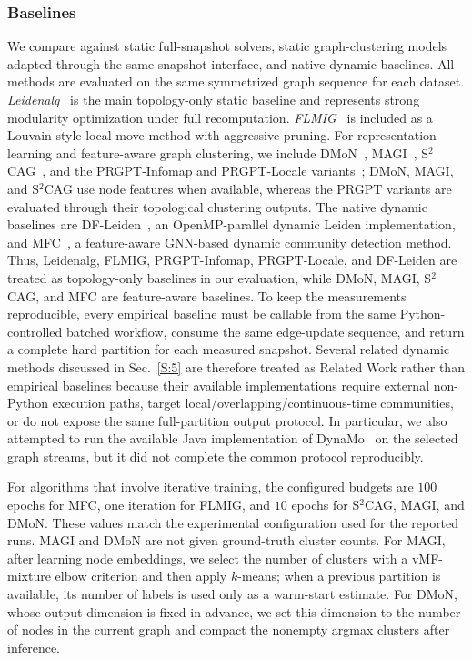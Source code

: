 \documentclass[conference]{IEEEtran}
\theoremstyle{definition}
\begin{document}
\subsubsection{Baselines}
We compare against static full-snapshot solvers, static graph-clustering
models adapted through the same snapshot interface, and native dynamic
baselines. All methods are evaluated on the same symmetrized graph sequence for
each dataset. \textit{Leidenalg}~\cite{TWE19} is the main topology-only static
baseline and represents strong modularity optimization under full
recomputation. \textit{FLMIG}~\cite{TTB24} is included as a Louvain-style local
move method with aggressive pruning. For representation-learning and
feature-aware graph clustering, we include DMoN~\cite{TPP23},
MAGI~\cite{LLC24}, S$^2$CAG~\cite{LYZ25}, and the PRGPT-Infomap and
PRGPT-Locale variants~\cite{QZG24HPEC}; DMoN, MAGI, and S$^2$CAG use node
features when available, whereas the PRGPT variants are evaluated through their
topological clustering outputs. The native dynamic baselines are
DF-Leiden~\cite{SLe24}, an OpenMP-parallel dynamic Leiden implementation, and
MFC~\cite{KZL24}, a feature-aware GNN-based dynamic community detection method.
Thus, Leidenalg, FLMIG, PRGPT-Infomap, PRGPT-Locale, and DF-Leiden are treated
as topology-only baselines in our evaluation, while DMoN, MAGI, S$^2$CAG, and
MFC are feature-aware baselines.
To keep the measurements reproducible, every empirical baseline must be
callable from the same Python-controlled batched workflow, consume the same
edge-update sequence, and return a complete hard partition for each measured
snapshot. Several related dynamic methods discussed in Sec.~\ref{S:5} are
therefore treated as Related Work rather than empirical baselines because their
available implementations require external non-Python execution paths, target
local/overlapping/continuous-time communities, or do not expose the same
full-partition output protocol. In particular, we also attempted to run the
available Java implementation of DynaMo~\cite{ZCL19} on the selected graph
streams, but it did not complete the common protocol reproducibly.

For algorithms that involve iterative training, the configured budgets are
$100$ epochs for MFC, one iteration for FLMIG, and $10$ epochs for S$^2$CAG,
MAGI, and DMoN. These values match the experimental configuration used for the
reported runs. MAGI and DMoN are not given ground-truth cluster counts. For
MAGI, after learning node embeddings, we select the number of clusters with a
vMF-mixture elbow criterion and then apply $k$-means; when a previous partition
is available, its number of labels is used only as a warm-start estimate. For
DMoN, whose output dimension is fixed in advance, we set this dimension to the
number of nodes in the current graph and compact the nonempty argmax clusters
after inference.
\end{document}
